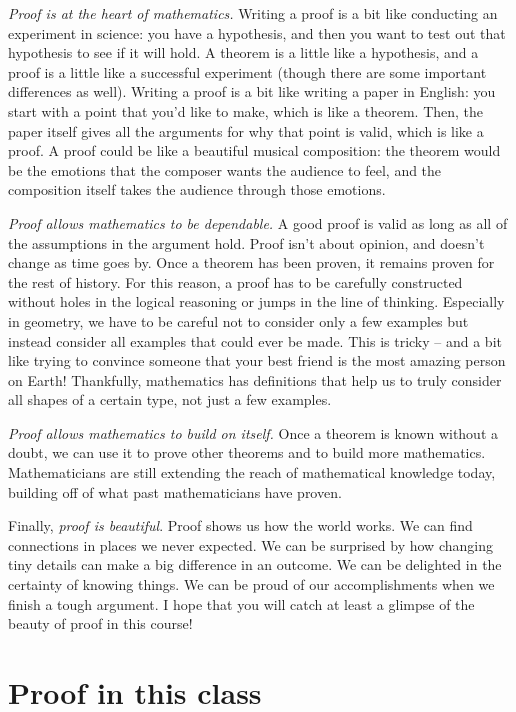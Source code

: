 \documentclass{ximera}
\begin{document}
\emph{Proof is at the heart of mathematics.} Writing a proof is a bit like conducting an experiment in science: you have a hypothesis, and then you want to test out that hypothesis to see if it will hold. A theorem is a little like a hypothesis, and a proof is a little like a successful experiment (though there are some important differences as well). Writing a proof is a bit like writing a paper in English: you start with a point that you'd like to make, which is like a theorem. Then, the paper itself gives all the arguments for why that point is valid, which is like a proof. A proof could be like a beautiful musical composition: the theorem would be the emotions that the composer wants the audience to feel, and the composition itself takes the audience through those emotions.

 \emph{Proof allows mathematics to be dependable.} A good proof is valid as long as all of the assumptions in the argument hold. Proof isn't about opinion, and doesn't change as time goes by. Once a theorem has been proven, it remains proven for the rest of history. For this reason, a proof has to be carefully constructed without holes in the logical reasoning or jumps in the line of thinking. Especially in geometry, we have to be careful not to consider only a few examples but instead consider all examples that could ever be made. This is tricky -- and a bit like trying to convince someone that your best friend is the most amazing person on Earth! Thankfully, mathematics has definitions that help us to truly consider all shapes of a certain type, not just a few examples.
 
\emph{Proof allows mathematics to build on itself.} Once a theorem is known without a doubt, we can use it to prove other theorems and to build more mathematics. Mathematicians are still extending the reach of mathematical knowledge today, building off of what past mathematicians have proven.
 
 Finally, \emph{proof is beautiful}. Proof shows us how the world works. We can find connections in places we never expected. We can be surprised by how changing tiny details can make a big difference in an outcome. We can be delighted in the certainty of knowing things. We can be proud of our accomplishments when we finish a tough argument. I hope that you will catch at least a glimpse of the beauty of proof in this course!


\section{Proof in this class}
\end{document}
